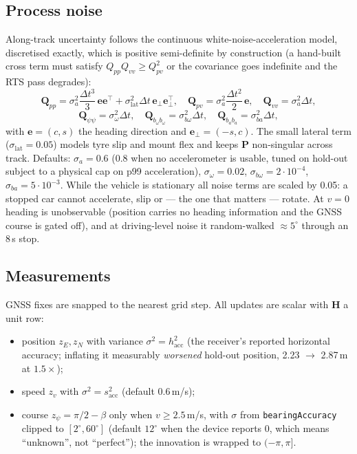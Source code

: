 \documentclass[10pt,a4paper]{article}
\newcommand{\Pm}{\mathbf{P}}
\newcommand{\Qm}{\mathbf{Q}}
\newcommand{\Hm}{\mathbf{H}}
\begin{document}
\subsection{Process noise}
Along-track uncertainty follows the continuous white-noise-acceleration model, discretised exactly, which is
positive semi-definite by construction (a hand-built cross term must satisfy
$Q_{pp}Q_{vv} \ge Q_{pv}^2$ or the covariance goes indefinite and the RTS pass degrades):
\begin{equation}
\Qm_{pp} = \sigma_a^2 \frac{\Delta t^3}{3}\,\bm e\bm e^\top + \sigma_\text{lat}^2\Delta t\,\bm e_\perp\bm e_\perp^\top,\quad
\Qm_{pv} = \sigma_a^2 \frac{\Delta t^2}{2}\,\bm e,\quad
\Qm_{vv} = \sigma_a^2\Delta t,
\end{equation}
\begin{equation}
\Qm_{\psi\psi} = \sigma_\omega^2\Delta t,\quad
\Qm_{b_\omega b_\omega} = \sigma_{b\omega}^2\Delta t,\quad
\Qm_{b_a b_a} = \sigma_{ba}^2\Delta t,
\end{equation}
with $\bm e = (c,s)$ the heading direction and $\bm e_\perp = (-s,c)$. The small lateral term
($\sigma_\text{lat} = 0.05$) models tyre slip and mount flex and keeps $\Pm$ non-singular across track.
Defaults: $\sigma_a = 0.6$ (0.8 when no accelerometer is usable, tuned on hold-out subject to a physical cap on
p99 acceleration), $\sigma_\omega = 0.02$, $\sigma_{b\omega} = 2\cdot10^{-4}$, $\sigma_{ba} = 5\cdot10^{-3}$.
While the vehicle is stationary all noise terms are scaled by 0.05: a stopped car cannot accelerate,
slip or --- the one that matters --- rotate. At $v=0$ heading is unobservable (position carries no heading
information and the GNSS course is gated off), and at driving-level noise it random-walked $\approx5^\circ$
through an 8\,s stop.

\subsection{Measurements}
GNSS fixes are snapped to the nearest grid step. All updates are scalar with $\Hm$ a unit row:
\begin{itemize}
\item position $z_E, z_N$ with variance $\sigma^2 = h_\text{acc}^2$ (the receiver's reported horizontal
  accuracy; inflating it measurably \emph{worsened} hold-out position, 2.23 $\to$ 2.87\,m at $1.5\times$);
\item speed $z_v$ with $\sigma^2 = s_\text{acc}^2$ (default 0.6\,m/s);
\item course $z_\psi = \pi/2 - \beta$ only when $v \ge 2.5$\,m/s, with $\sigma$ from \texttt{bearingAccuracy}
  clipped to $[2^\circ, 60^\circ]$ (default $12^\circ$ when the device reports 0, which means ``unknown'', not
  ``perfect''); the innovation is wrapped to $(-\pi, \pi]$.
\end{itemize}
\end{document}
